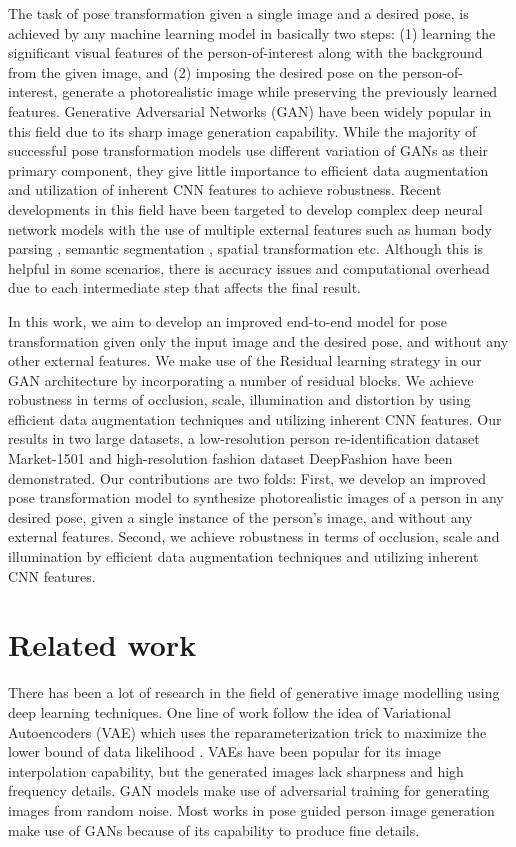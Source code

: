 \documentclass[runningheads]{llncs}
\begin{document}
The task of pose transformation given a single image and a desired pose, is achieved by any machine learning model in basically two steps: (1) learning the significant visual features of the person-of-interest along with the background from the given image, and (2) imposing the desired pose on the person-of-interest, generate a photorealistic image while preserving the previously learned features. Generative Adversarial Networks (GAN) \cite{goodfellow-gan} have been widely popular in this field due to its sharp image generation capability. While the majority of successful pose transformation models use different variation of GANs as their primary component, they give little importance to efficient data augmentation and utilization of inherent CNN features to achieve robustness. Recent developments in this field have been targeted to develop complex deep neural network models with the use of multiple external features such as human body parsing \cite{soft-gated}, semantic segmentation \cite{soft-gated}\cite{balakrishnan}, spatial transformation \cite{balakrishnan}\cite{deformable-gans} etc. Although this is helpful in some scenarios, there is accuracy issues and computational overhead due to each intermediate step that affects the final result.

In this work, we aim to develop an improved end-to-end model for pose transformation given only the input image and the desired pose, and without any other external features. We make use of the Residual learning strategy \cite{resnet} in our GAN architecture by incorporating a number of residual blocks. We achieve robustness in terms of occlusion, scale, illumination and distortion by using efficient data augmentation techniques and utilizing inherent CNN features. Our results in two large datasets, a low-resolution person re-identification dataset Market-1501 \cite{market-1501} and high-resolution fashion dataset DeepFashion \cite{deepfashion} have been demonstrated. Our contributions are two folds: First, we develop an improved pose transformation model to synthesize photorealistic images of a person in any desired pose, given a single instance of the person’s image, and without any external features. Second, we achieve robustness in terms of occlusion, scale and illumination by efficient data augmentation techniques and utilizing inherent CNN features.
%
\section{Related work}
There has been a lot of research in the field of generative image modelling using deep learning techniques. One line of work follow the idea of Variational Autoencoders (VAE) \cite{kingma-vae} which uses the reparameterization trick to maximize the lower bound of data likelihood \cite{mypaper}. VAEs have been popular for its image interpolation capability, but the generated images lack sharpness and high frequency details. GAN \cite{goodfellow-gan} models make use of adversarial training for generating images from random noise. Most works in pose guided person image generation make use of GANs because of its capability to produce fine details.
\end{document}
